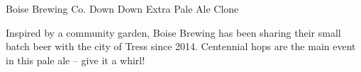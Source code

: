 \begin{recipie}{Boise Brewing Co. Down Down Extra Pale Ale Clone}

\begin{aboutblock}
Inspired by a community garden, Boise Brewing has been sharing their small batch
beer with the city of Tress since 2014. Centennial hops are the main event in this
pale ale -- give it a whirl! \sourceaha
\end{aboutblock}


\begin{methodandtiming}
 
\begin{mashsteps}
\end{mashsteps}

\end{methodandtiming}

\pagebreak

\begin{ingredientsblock}

\begin{malts}
\end{malts}

\begin{hops}
\end{hops}


\end{ingredientsblock}

\end{recipie}